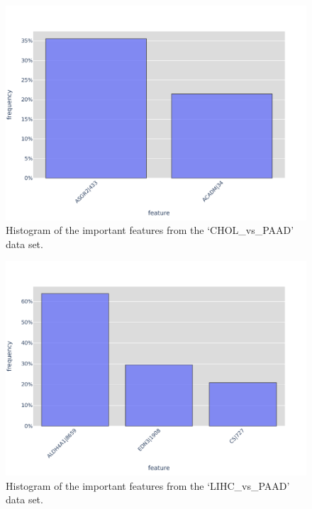 \begin{figure}[H]
    \centering
    \includegraphics[width=0.9\columnwidth]{figures/genes/featureHistogram_TCGA_CHOL_vs_PAAD.pdf}
    \caption{Histogram of the important features from the `CHOL\_vs\_PAAD' data set.}\label{fig:histCHOLvsPAAD}
\end{figure}
\begin{figure}[H]
    \centering
    \includegraphics[width=0.9\columnwidth]{figures/genes/featureHistogram_TCGA_LIHC_vs_PAAD.pdf}
    \caption{Histogram of the important features from the `LIHC\_vs\_PAAD' data set.}\label{fig:histLIHCvsPAAD}
\end{figure}
